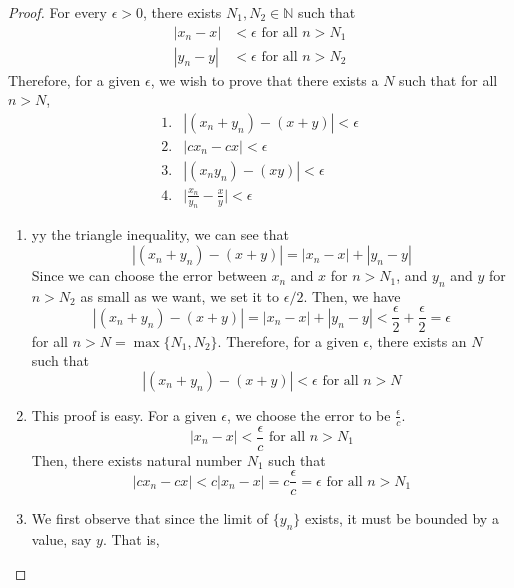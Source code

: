   \begin{proof}
    For every $\epsilon > 0$, there exists $N_1, N_2 \in \mathbb{N}$ such that
    \begin{align}
      |x_n - x| &< \epsilon \text{ for all } n > N_1 \\
      |y_n - y| &< \epsilon \text{ for all } n > N_2
    \end{align}
    Therefore, for a given $\epsilon$, we wish to prove that there exists a $N$ such that for all $n > N$, 
    \begin{align}
      1. & |(x_n + y_n) - (x+y)| < \epsilon \\
      2. & |c x_n - cx| < \epsilon \\
      3. & |(x_n y_n) - (xy)| < \epsilon \\
      4. & \bigg| \frac{x_n}{y_n} - \frac{x}{y} \bigg| < \epsilon
    \end{align}
    \begin{enumerate}
      \item yy the triangle inequality, we can see that
      \begin{equation}
        |(x_n + y_n) - (x+y)| = |x_n - x| + |y_n - y|
      \end{equation}
      Since we can choose the error between $x_n$ and $x$ for $n > N_1$, and $y_n$ and $y$ for $n>N_2$ as small as we want, we set it to $\epsilon/2$. Then, we have
      \begin{equation}
        |(x_n + y_n) - (x+y)| = |x_n - x| + |y_n - y| < \frac{\epsilon}{2} + \frac{\epsilon}{2} = \epsilon
      \end{equation}
      for all $n> N = \max\{N_1, N_2\}$. Therefore, for a given $\epsilon$, there exists an $N$ such that 
      \begin{equation}
        |(x_n + y_n) - (x+y)| < \epsilon \text{ for all } n > N
      \end{equation}
      \item This proof is easy. For a given $\epsilon$, we choose the error to be $\frac{\epsilon}{c}$.
      \begin{equation}
        |x_n - x| < \frac{\epsilon}{c} \text{ for all } n >N_1
      \end{equation}
      Then, there exists natural number $N_1$ such that
      \begin{equation}
        |c x_n - c x| < c |x_n - x| =  c \frac{\epsilon}{c} = \epsilon \text{ for all } n > N_1
      \end{equation}
      \item We first observe that since the limit of $\{y_n\}$ exists, it must be bounded by a value, say $y$. That is, 

\end{enumerate}
\end{proof}
